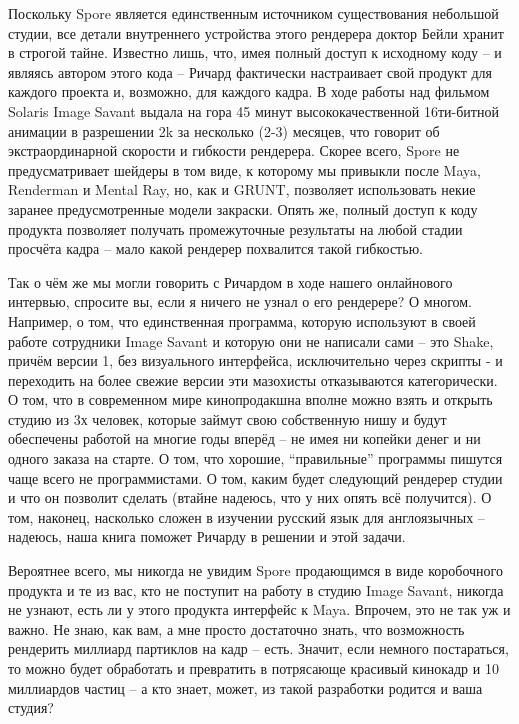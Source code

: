  Поскольку Spore является единственным источником
    существования небольшой студии, все детали внутреннего устройства
    этого рендерера доктор Бейли хранит в строгой тайне. Известно лишь,
    что, имея полный доступ к исходному коду – и являясь автором этого
    кода – Ричард фактически настраивает свой продукт для каждого
    проекта и, возможно, для каждого кадра. В ходе работы над фильмом
    Solaris Image Savant выдала на гора 45 минут высококачественной
    16ти-битной анимации в разрешении 2k за несколько (2-3) месяцев,
    что говорит об экстраординарной скорости и гибкости рендерера.
    Скорее всего, Spore не предусматривает шейдеры в том виде, к
    которому мы привыкли после Maya, Renderman и Mental Ray, но, как и
    GRUNT, позволяет использовать некие заранее предусмотренные модели
    закраски. Опять же, полный доступ к коду продукта позволяет
    получать промежуточные результаты на любой стадии просчёта кадра –
    мало какой рендерер похвалится такой гибкостью.
  

 Так о чём же мы могли говорить с Ричардом в ходе
    нашего онлайнового интервью, спросите вы, если я ничего не узнал о
    его рендерере? О многом. Например, о том, что единственная
    программа, которую используют в своей работе сотрудники Image
    Savant и которую они не написали сами – это Shake, причём версии 1,
    без визуального интерфейса, исключительно через скрипты - и
    переходить на более свежие версии эти мазохисты отказываются
    категорически. О том, что в современном мире кинопродакшна вполне
    можно взять и открыть студию из 3х человек, которые займут свою
    собственную нишу и будут обеспечены работой на многие годы вперёд –
    не имея ни копейки денег и ни одного заказа на старте. О том, что
    хорошие, “правильные” программы пишутся чаще всего не
    программистами. О том, каким будет следующий рендерер
    студии  и что он
    позволит сделать (втайне надеюсь, что у них опять всё получится). О
    том, наконец, насколько сложен в изучении русский язык для
    англоязычных – надеюсь, наша книга поможет Ричарду в решении и этой
    задачи.
  

 Вероятнее всего, мы никогда не увидим Spore
    продающимся в виде коробочного продукта и те из вас, кто не
    поступит на работу в студию Image Savant, никогда не узнают, есть
    ли у этого продукта интерфейс к Maya. Впрочем, это не так уж и
    важно. Не знаю, как вам, а мне просто достаточно знать, что
    возможность рендерить миллиард партиклов на кадр – есть. Значит,
    если немного постараться, то можно будет обработать и превратить в
    потрясающе красивый кинокадр и 10 миллиардов частиц – а кто знает,
    может, из такой разработки родится и ваша студия?